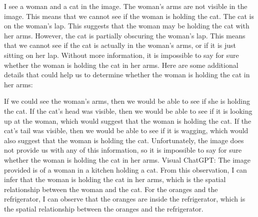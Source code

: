 \begin{enumerate}
    I see a woman and a cat in the image.
    The woman's arms are not visible in the image. This means that we cannot see if the woman is holding the cat.
    The cat is on the woman's lap. This suggests that the woman may be holding the cat with her arms.
    However, the cat is partially obscuring the woman's lap. This means that we cannot see if the cat is actually in the woman's arms, or if it is just sitting on her lap.
    Without more information, it is impossible to say for sure whether the woman is holding the cat in her arms.
    Here are some additional details that could help us to determine whether the woman is holding the cat in her arms:
    
    If we could see the woman's arms, then we would be able to see if she is holding the cat.
    If the cat's head was visible, then we would be able to see if it is looking up at the woman, which would suggest that the woman is holding the cat.
    If the cat's tail was visible, then we would be able to see if it is wagging, which would also suggest that the woman is holding the cat.
    Unfortunately, the image does not provide us with any of this information, so it is impossible to say for sure whether the woman is holding the cat in her arms.
    \subitem Visual ChatGPT: The image provided is of a woman in a kitchen holding a cat. From this observation, I can infer that the woman is holding the cat in her arms, which is the spatial relationship between the woman and the cat. For the oranges and the refrigerator, I can observe that the oranges are inside the refrigerator, which is the spatial relationship between the oranges and the refrigerator.
\end{enumerate}